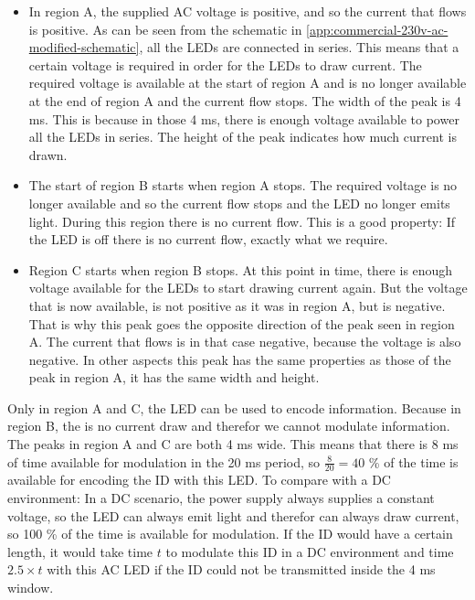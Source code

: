 \begin{itemize}
	\item In region A, the supplied AC voltage is positive, and so the current that flows is positive.
	As can be seen from the schematic in \autoref{app:commercial-230v-ac-modified-schematic}, all the LEDs are connected in series.
	This means that a certain voltage is required in order for the LEDs to draw current.
	The required voltage is available at the start of region A and is no longer available at the end of region A and the current flow stops.
	The width of the peak is 4 ms.
	This is because in those 4 ms, there is enough voltage available to power all the LEDs in series. 
	The height of the peak indicates how much current is drawn.

	\item The start of region B starts when region A stops.
	The required voltage is no longer available and so the current flow stops and the LED no longer emits light.
	During this region there is no current flow.
	This is a good property: If the LED is off there is no current flow, exactly what we require.

	\item Region C starts when region B stops.
	At this point in time, there is enough voltage available for the LEDs to start drawing current again.
	But the voltage that is now available, is not positive as it was in region A, but is negative.
	That is why this peak goes the opposite direction of the peak seen in region A.
	The current that flows is in that case negative, because the voltage is also negative.
	In other aspects this peak has the same properties as those of the peak in region A, it has the same width and height.

\end{itemize}


Only in region A and C, the LED can be used to encode information.
Because in region B, the is no current draw and therefor we cannot modulate information.
The peaks in region A and C are both 4 ms wide.
This means that there is 8 ms of time available for modulation in the 20 ms period, so $\frac{8}{20} = 40$ \% of the time is available for encoding the ID with this LED.
To compare with a DC environment: In a DC scenario, the power supply always supplies a constant voltage, so the LED can always emit light and therefor can always draw current, so 100 \% of the time is available for modulation.
If the ID would have a certain length, it would take time $t$ to modulate this ID in a DC environment and time $2.5 \times t$ with this AC LED if the ID could not be transmitted inside the 4 ms window. 



